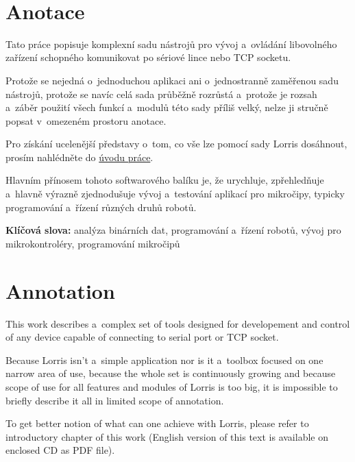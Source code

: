 \documentclass[12pt, a4paper, oneside]{article}
\newcommand{\D}{\medskip \noindent} %
\newcommand{\B}{\textbf} %
\begin{document}
\newpage   %
~ %
\vspace{-20mm}

\section*{Anotace}

Tato práce popisuje komplexní sadu nástrojů pro vývoj a~ovládání libovolného zařízení schopného komunikovat po sériové lince nebo TCP socketu.

Protože se nejedná o~jednoduchou aplikaci ani o~jednostranně zaměřenou sadu nástrojů, protože se navíc celá sada průběžně rozrůstá a~protože je rozsah a~záběr použití všech funkcí a~modulů této sady příliš velký, nelze ji stručně popsat v~omezeném prostoru anotace.

Pro získání ucelenější představy o~tom, co vše lze pomocí sady Lorris dosáhnout, prosím nahlédněte do \hyperref[uvod]{úvodu práce}.


Hlavním přínosem tohoto softwarového balíku je, že urychluje, zpřehledňuje a~hlavně výrazně zjednodušuje vývoj a~testování aplikací pro mikročipy, typicky programování a~řízení různých druhů robotů.

\D \B{Klíčová slova:} analýza binárních dat, programování a~řízení robotů, vývoj pro mikrokontroléry, programování mikročipů

\section*{Annotation}

This work describes a~complex set of tools designed for developement and control of any device capable of connecting to serial port or TCP socket.

Because Lorris isn't a~simple application nor is it a~toolbox focused on one narrow area of use, because the whole set is continuously growing and because scope of use for all features and modules of Lorris is too big, it is impossible to briefly describe it all in limited scope of annotation.

To get better notion of what can one achieve with Lorris, please refer to introductory chapter of this work (English version of this text is available on enclosed CD as PDF file).
\end{document}
